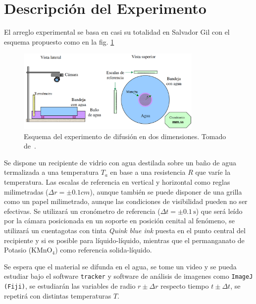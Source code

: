 \documentclass{article}[13pt]
\begin{document}
\section*{Descripción del Experimento}
El arreglo experimental se basa en casi su totalidad en Salvador Gil con el esquema propuesto como en la fig. \ref{fig:esquema_experimental}
\begin{figure}[htp]
    \centering
    \includegraphics[width=0.8\textwidth]{figs/esquema_refGil.png}
    \caption{Esquema del experimento de difusión en dos dimensiones. Tomado de~\cite{gilExperimentosFisicaUsando2014}.}
    \label{fig:esquema_experimental}
\end{figure}
Se dispone un recipiente de vidrio con agua destilada sobre un baño de agua termalizada a una temperatura $T_a$ en base a una resistencia $R$ que varíe la temperatura. Las escalas de referencia en vertical y horizontal como reglas milimetradas ($\Delta r = \pm 0.1 cm$), aunque también se puede disponer de una grilla como un papel milimetrado, aunque las condiciones de visibilidad pueden no ser efectivas. Se utilizará un cronómetro de referencia ($\Delta t = \pm 0.1 \, \unit{\second}$) que será leído por la cámara posicionada en un soporte en posición cenital al fenómeno, se utilizará un cuentagotas con tinta  \textit{Quink blue ink} puesta en el punto central del recipiente y si es posible para líquido-líquido, mientras que el permanganato de Potasio (KMnO$_4$) como referencia solida-líquido.

Se espera que el material se difunda en el agua, se tome un video y se pueda estudiar bajo el software \texttt{tracker} y software de análisis de imagenes como \texttt{ImageJ (Fiji)}, se estudiarán las variables de radio $r\pm\Delta r$ respecto tiempo $t\pm\Delta t$, se repetirá con distintas temperaturas $T$.
\end{document}

